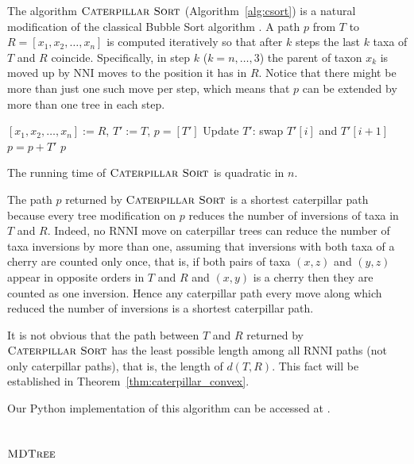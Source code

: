 \documentclass{amsart}
\newcommand{\nni}{\mathrm{NNI}}
\newcommand{\rnni}{\mathrm{RNNI}}
\newcommand{\csort}{\textsc{Caterpillar Sort}}
\newcommand{\mdtree}{\textsc{MDTree}}
\begin{document}
The algorithm $\csort$ (Algorithm~\ref{alg:csort}) is a natural modification of the classical Bubble Sort algorithm \autocite{Knuth1997-pi}.
A path $p$ from $T$ to $R= [x_1, x_2, \ldots, x_n]$ is computed iteratively so that after $k$ steps the last $k$ taxa of $T$ and $R$ coincide.
Specifically, in step $k$ ($k = n, \ldots, 3$) the parent of taxon $x_{k}$ is moved up by $\nni$ moves to the position it has in $R$.
Notice that there might be more than just one such move per step, which means that $p$ can be extended by more than one tree in each step.

\begin{algorithm}[H]
\caption{$\csort$($T,R$)}
\label{alg:csort}
\begin{algorithmic}[1]
\STATE $[x_1, x_2, \ldots, x_n] := R$, $T' := T$, $p = [T']$
            \STATE Update $T'$: swap $T'[i]$ and $T'[i+1]$
            \STATE $p = p + T'$
        \ENDIF
    \ENDFOR
\ENDFOR
\RETURN $p$
\end{algorithmic}
\end{algorithm}

The running time of $\csort$ is quadratic in $n$.

The path $p$ returned by $\csort$ is a shortest caterpillar path because every tree modification on $p$ reduces the number of inversions of taxa in $T$ and $R$.
Indeed, no $\rnni$ move on caterpillar trees can reduce the number of taxa inversions by more than one, assuming that inversions with both taxa of a cherry are counted only once, that is, if both pairs of taxa $(x, z)$ and $(y, z)$ appear in opposite orders in $T$ and $R$ and $(x,y)$ is a cherry then they are counted as one inversion.
Hence any caterpillar path every move along which reduced the number of inversions is a shortest caterpillar path.

It is not obvious that the path between $T$ and $R$ returned by $\csort$ has the least possible length among all $\rnni$ paths (not only caterpillar paths), that is, the length of $d(T, R)$.
This fact will be established in Theorem~\ref{thm:caterpillar_convex}.

Our Python implementation of this algorithm can be accessed at \autocite{Collienne2019}.


\subsection{$\mdtree$}
\label{section:alg_mdtree}
\end{document}
